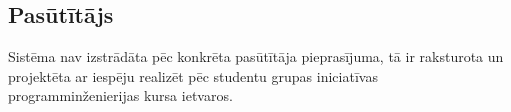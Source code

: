 \subsection{Pasūtītājs}
Sistēma nav izstrādāta pēc konkrēta pasūtītāja pieprasījuma, tā ir raksturota
un projektēta ar iespēju realizēt pēc studentu grupas iniciatīvas
programminženierijas kursa ietvaros.
